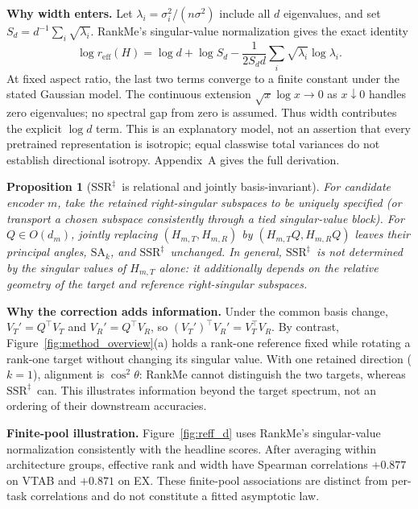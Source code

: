 \documentclass{article}
\newcommand{\reff}{\ensuremath{r_{\mathrm{eff}}}\xspace}
\newcommand{\SAk}{\ensuremath{\mathrm{SA}_k}\xspace}
\newcommand{\SSRdag}{\ensuremath{\mathrm{SSR}^{\ddagger}}\xspace}
\newtheorem{proposition}[lemma]{Proposition}
\begin{document}
\textbf{Why width enters.} Let $\lambda_i=\sigma_i^2/(n\sigma^2)$ include all $d$ eigenvalues, and set $S_d=d^{-1}\sum_i\sqrt{\lambda_i}$. RankMe's singular-value normalization gives the exact identity
\[
 \log\reff(H)=\log d+\log S_d
 -\frac{1}{2S_d d}\sum_i\sqrt{\lambda_i}\log\lambda_i.
\]
At fixed aspect ratio, the last two terms converge to a finite constant under the stated Gaussian model. The continuous extension $\sqrt{x}\log x\to0$ as $x\downarrow0$ handles zero eigenvalues; no spectral gap from zero is assumed. Thus width contributes the explicit $\log d$ term. This is an explanatory model, not an assertion that every pretrained representation is isotropic; equal classwise total variances do not establish directional isotropy. Appendix~A gives the full derivation.

\begin{proposition}[\SSRdag\ is relational and jointly basis-invariant]
\label{prop:nonrot}
For candidate encoder $m$, take the retained right-singular subspaces to be uniquely specified (or transport a chosen subspace consistently through a tied singular-value block). For $Q\in O(d_m)$, jointly replacing $(H_{m,T},H_{m,R})$ by $(H_{m,T}Q,H_{m,R}Q)$ leaves their principal angles, $\SAk$, and \SSRdag\ unchanged. In general, \SSRdag\ is not determined by the singular values of $H_{m,T}$ alone: it additionally depends on the relative geometry of the target and reference right-singular subspaces.
\end{proposition}

\textbf{Why the correction adds information.} Under the common basis change, $V_T'=Q^\top V_T$ and $V_R'=Q^\top V_R$, so $(V_T')^\top V_R'=V_T^\top V_R$. By contrast, Figure~\ref{fig:method_overview}(a) holds a rank-one reference fixed while rotating a rank-one target without changing its singular value. With one retained direction ($k=1$), alignment is $\cos^2\theta$: RankMe cannot distinguish the two targets, whereas \SSRdag\ can. This illustrates information beyond the target spectrum, not an ordering of their downstream accuracies.



\textbf{Finite-pool illustration.} Figure~\ref{fig:reff_d} uses RankMe's singular-value normalization consistently with the headline scores. After averaging within architecture groups, effective rank and width have Spearman correlations $+0.877$ on VTAB and $+0.871$ on EX. These finite-pool associations are distinct from per-task correlations and do not constitute a fitted asymptotic law.
\end{document}
